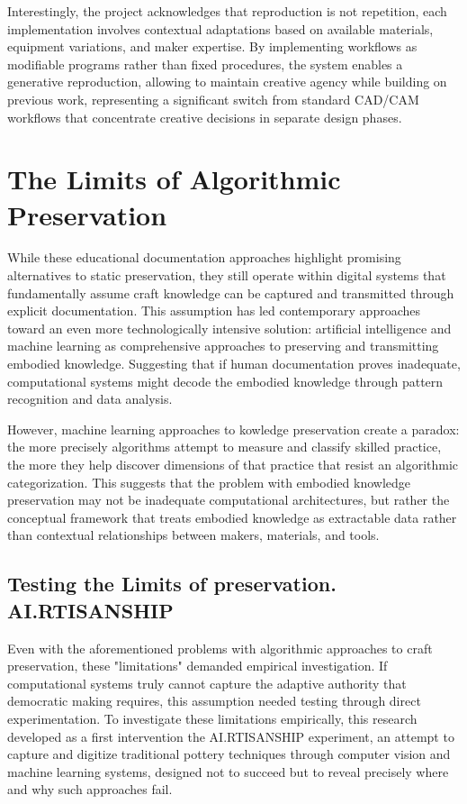 \vspace{0.5cm}

Interestingly, the project acknowledges that reproduction is not repetition, each implementation involves contextual adaptations based on available materials, equipment variations, and maker expertise. By implementing workflows as modifiable programs rather than fixed procedures, the system enables a generative reproduction, allowing to maintain creative agency while building on previous work, representing a significant switch from standard CAD/CAM workflows that concentrate creative decisions in separate design phases.

\section{The Limits of Algorithmic Preservation}

While these educational documentation approaches highlight promising alternatives to static preservation, they still operate within digital systems that fundamentally assume craft knowledge can be captured and transmitted through explicit documentation. This assumption has led contemporary approaches toward an even more technologically intensive solution: artificial intelligence and machine learning as comprehensive approaches to preserving and transmitting embodied knowledge. Suggesting that if human documentation proves inadequate, computational systems might decode the embodied knowledge through pattern recognition and data analysis.
\vspace{0.5cm}

However, machine learning approaches to kowledge preservation create a paradox: the more precisely algorithms attempt to measure and classify skilled practice, the more they help discover dimensions of that practice that resist an algorithmic categorization. This suggests that the problem with embodied knowledge preservation may not be inadequate computational architectures, but rather the conceptual framework that treats embodied knowledge as extractable data rather than contextual relationships between makers, materials, and tools.

\subsection{Testing the Limits of preservation. AI.RTISANSHIP}

Even with the aforementioned problems with algorithmic approaches to craft preservation, these "limitations" demanded empirical investigation. If computational systems truly cannot capture the adaptive authority that democratic making requires, this assumption needed testing through direct experimentation. To investigate these limitations empirically, this research developed as a first intervention the AI.RTISANSHIP experiment, an attempt to capture and digitize traditional pottery techniques through computer vision and machine learning systems, designed not to succeed but to reveal precisely where and why such approaches fail.

